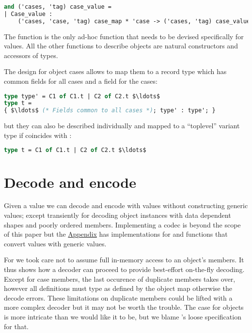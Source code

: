 \documentclass[nolinenum]{jfp}
\begin{document}
\begin{lstlisting}[language=ocaml]
and ('cases, 'tag) case_value =
| Case_value :
    ('cases, 'case, 'tag) case_map * 'case -> ('cases, 'tag) case_value
\end{lstlisting}
%
The  function is the only ad-hoc function that needs
to be devised specifically for  values. All the other
functions to describe objects are natural constructors and accessors
of \ml{} types.

The design for object cases allows to map them to a record type
which has common fields for all cases and a field for the cases:
%
\begin{lstlisting}[language=ocaml]
type type' = C1 of C1.t | C2 of C2.t $\ldots$
type t =
{ $\ldots$ (* Fields common to all cases *); type' : type'; }
\end{lstlisting}
%
but they can also be described individually and mapped to
 a ``toplevel'' variant type if  coincides with :
%
\begin{lstlisting}[language=ocaml]
type t = C1 of C1.t | C2 of C2.t $\ldots$
\end{lstlisting}

\section{Decode and encode}
\label{sec:convert}

Given a  value we can decode and encode \json{} with \ml{}
values without constructing generic  values; except
transiently for decoding object instances with data dependent shapes
and poorly ordered members. Implementing a \json{} codec is beyond the
scope of this paper but the \hyperref[sec:appendix]{Appendix} has
implementations for  and  functions that convert
\ml{} values with generic  values.

For  we took care not to assume full in-memory access to
an object's members. It thus shows how a decoder can proceed to
provide best-effort on-the-fly decoding. Except for case members, the
last occurence of duplicate members takes over, however all definitions
must type as defined by the object map otherwise the decode
errors. These limitations on duplicate members could be lifted with a
more complex decoder but it may not be worth the trouble. The case for
objects is more intricate than we would like it to be, but we blame
\json{}'s loose specification for that.
\end{document}

